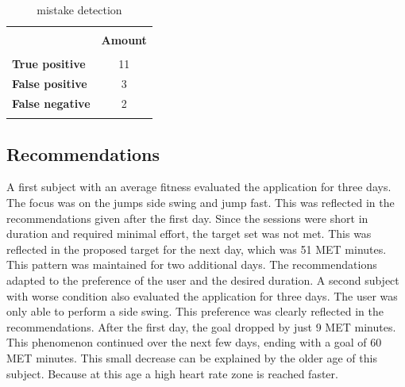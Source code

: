 \documentclass[twocolumn]{phdsymp} %
\begin{document}
\begin{table}[!htpd]
    \centering
  \begin{tabular}{lc}
 \hline \\
    \textbf{}               & \textbf{Amount} &\\
     \hline \\
    \textbf{True positive}  & 11                &\\
    \textbf{False positive} & 3                 & \\
    \textbf{False negative}  & 2               &\\
 \hline \\
    \end{tabular}
    \caption{mistake detection}
    \label{tab:mistake}
\end{table}

\subsection{Recommendations}
A first subject with an average fitness evaluated the application for three days. The focus was on the jumps side swing and jump fast. This was reflected in the recommendations given after the first day. Since the sessions were short in duration and required minimal effort, the target set was not met. This was reflected in the proposed target for the next day, which was 51 MET minutes. This pattern was maintained for two additional days. The recommendations adapted to the preference of the user and the desired duration.
A second subject with worse condition also evaluated the application for three days. The user was only able to perform a side swing. This preference was clearly reflected in the recommendations. After the first day, the goal dropped by just 9 MET minutes. This phenomenon continued over the next few days, ending with a goal of 60 MET minutes. This small decrease can be explained by the older age of this subject. Because at this age a high heart rate zone is reached faster.
\end{document}
